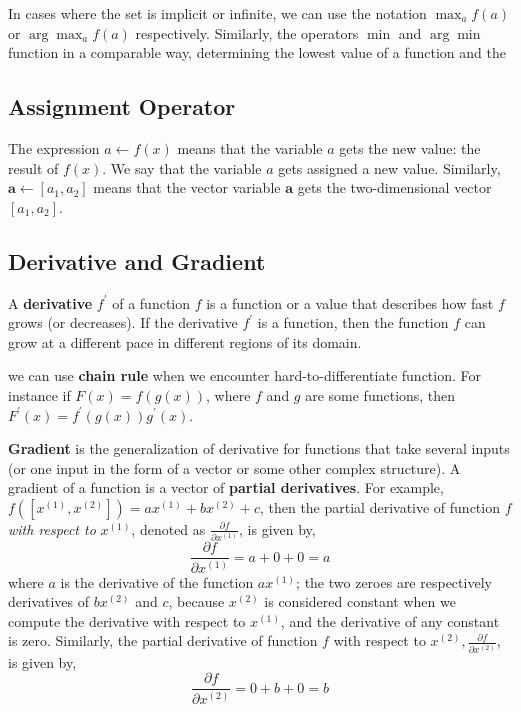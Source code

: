 In cases where the set is implicit or infinite, we can use the notation \( \max_{a} f(a) \) or \( \arg \max_{a} f(a) \) respectively. Similarly, the operators \( \min \) and \( \arg \min \) function in a comparable way, determining the lowest value of a function and the

\subsection{Assignment Operator}
The expression \(a \leftarrow f(x)\) means that the variable \(a\) gets the new value: the result of \(f(x)\). We say that the variable \(a\) gets assigned a new value. Similarly, \(\mathbf{a} \leftarrow\left[a_{1}, a_{2}\right]\) means that the vector variable \(\mathbf{a}\) gets the two-dimensional vector \(\left[a_{1}, a_{2}\right]\).

\subsection{Derivative and Gradient}
A \textbf{derivative} \(f^{\prime}\) of a function \(f\) is a function or a value that describes how fast \(f\) grows (or decreases). If the derivative \(f^{\prime}\) is a function, then the function \(f\) can grow at a different pace in different regions of its domain.

we can use \textbf{chain rule} when we encounter hard-to-differentiate function. For instance if \(F(x)=f(g(x))\), where \(f\) and \(g\) are some functions, then \(F^{\prime}(x)= f^{\prime}(g(x)) g^{\prime}(x)\).

\textbf{Gradient} is the generalization of derivative for functions that take several inputs (or one input in the form of a vector or some other complex structure). A gradient of a function is a vector of \textbf{partial derivatives}. For example, \(f\left(\left[x^{(1)}, x^{(2)}\right]\right)=a x^{(1)}+b x^{(2)}+c\), then the partial derivative of function \(f\) \textit{with respect to} \(x^{(1)}\), denoted as \(\frac{\partial f}{\partial x^{(1)}}\), is given by,
$$
	\frac{\partial f}{\partial x^{(1)}}=a+0+0=a
$$
where \(a\) is the derivative of the function \(a x^{(1)}\); the two zeroes are respectively derivatives of
\(b x^{(2)}\) and \(c\), because \(x^{(2)}\) is considered constant when we compute the derivative with respect
to \(x^{(1)}\), and the derivative of any constant is zero. Similarly, the partial derivative of function \(f\) with respect to \(x^{(2)}, \frac{\partial f}{\partial x^{(2)}}\), is given by,
$$
	\frac{\partial f}{\partial x^{(2)}}=0+b+0=b
$$

